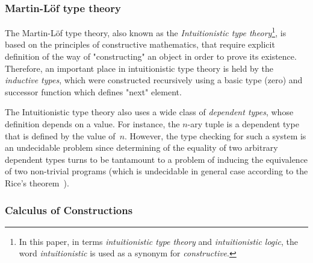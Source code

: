 \documentclass[article]{aaltoseries}
\begin{document}

\subsubsection{Martin-Löf type theory}
The Martin-Löf type theory, also known as the \textit{Intuitionistic type theory}\footnote{In this paper, in terms \textit{intuitionistic type theory} and \textit{intuitionistic logic}, the word \textit{intuitionistic} is used as a synonym for \textit{constructive}.}, is based on the principles of constructive mathematics, that require explicit definition of the way of "constructing" an object in order to prove its existence. Therefore, an important place in intuitionistic type theory is held by the \textit{inductive types}, which were constructed recursively using a basic type (zero) and successor function which defines "next" element.

The Intuitionistic type theory also uses a wide class of \textit{dependent types}, whose definition depends on a value. For instance, the $n$-ary tuple is a dependent type that is defined by the value of~$n$. However, the type checking for such a system is an undecidable problem since determining of the equality of two arbitrary dependent types turns to be tantamount to a problem of inducing the equivalence of two non-trivial programs (which is undecidable in general case according to the Rice's theorem~\cite{Rice53}).



\subsubsection{Calculus of Constructions}
\end{document}
